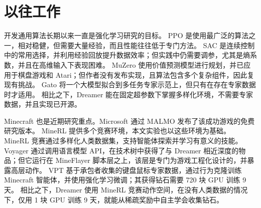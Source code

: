 \pagebreak
\section*{以往工作}
\label{sec:related}

开发通用算法长期以来一直是强化学习研究的目标。
PPO\citep{schulman2017ppo} 是使用最广泛的算法之一，相对稳健，但需要大量经验，而且性能往往低于专门方法。
SAC\citep{haarnoja2018sac} 是连续控制中的常用选择，并利用经验回放提升数据效率；但实践中仍需要调参，尤其是熵系数，并且在高维输入下表现困难\citep{yarats2019sacae}。
MuZero\citep{schrittwieser2019muzero} 使用价值预测模型进行规划，并已应用于棋盘游戏和 Atari；但作者没有发布实现，且算法包含多个复杂组件，因此复现有挑战。
Gato\citep{reed2022gato} 将一个大模型拟合到多任务专家示范上，但只有在存在专家数据时才适用。
相比之下，Dreamer 能在固定超参数下掌握多样化环境，不需要专家数据，并且实现已开源。

Minecraft 也是近期研究重点。Microsoft 通过 MALMO\citep{johnson2016malmo} 发布了该成功游戏的免费研究版本。
MineRL\citep{guss2019minerl} 提供多个竞赛环境，本文实验也以这些环境为基础。
MineRL 竞赛通过多样化人类数据集，支持智能体探索并学习有意义的技能\citep{guss2019minerl}。
Voyager\citep{wang2023voyager} 通过调用语言模型 API，在技术树中获得了与 Dreamer 相近深度的物品；但它运行在 MineFlayer 脚本层之上，该层是专门为游戏工程化设计的，并暴露高层动作。
VPT\citep{baker2022vpt} 基于承包者收集的键盘鼠标专家数据，通过行为克隆训练 Minecraft 智能体，并使用强化学习微调；其获得钻石需要 720 块 GPU 训练 9 天。
相比之下，Dreamer 使用 MineRL 竞赛动作空间，在没有人类数据的情况下，仅用 1 块 GPU 训练 9 天，就能从稀疏奖励中自主学会收集钻石。
